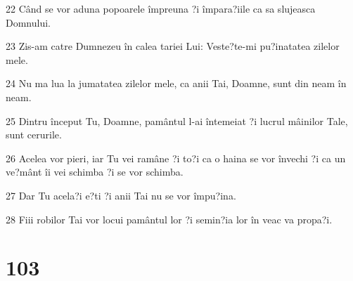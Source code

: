 \par 22 Când se vor aduna popoarele împreuna ?i împara?iile ca sa slujeasca Domnului.
\par 23 Zis-am catre Dumnezeu în calea tariei Lui: Veste?te-mi pu?inatatea zilelor mele.
\par 24 Nu ma lua la jumatatea zilelor mele, ca anii Tai, Doamne, sunt din neam în neam.
\par 25 Dintru început Tu, Doamne, pamântul l-ai întemeiat ?i lucrul mâinilor Tale, sunt cerurile.
\par 26 Acelea vor pieri, iar Tu vei ramâne ?i to?i ca o haina se vor învechi ?i ca un ve?mânt îi vei schimba ?i se vor schimba.
\par 27 Dar Tu acela?i e?ti ?i anii Tai nu se vor împu?ina.
\par 28 Fiii robilor Tai vor locui pamântul lor ?i semin?ia lor în veac va propa?i.

\chapter{103}

